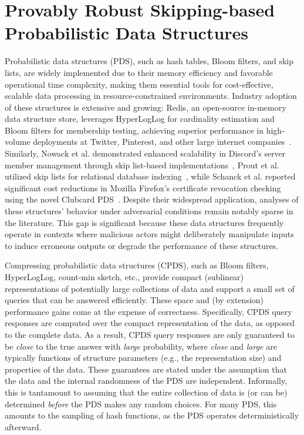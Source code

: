 \chapter{Provably Robust Skipping-based Probabilistic Data Structures}

Probabilistic data structures (PDS), such as hash tables, Bloom filters, and skip lists, are widely implemented due to their memory efficiency and favorable operational time complexity, making them essential tools for cost-effective, scalable data processing in resource-constrained environments. Industry adoption of these structures is extensive and growing: Redis, an open-source in-memory data structure store, leverages HyperLogLog for cardinality estimation and Bloom filters for membership testing, achieving superior performance in high-volume deployments at Twitter, Pinterest, and other large internet companies~\cite{redis}. Similarly, Nowack et al. demonstrated enhanced scalability in Discord's server member management through skip list-based implementations~\cite{discord}, Prout et al. utilized skip lists for relational database indexing~\cite{singlestore}, while Schanck et al. reported significant cost reductions in Mozilla Firefox's certificate revocation checking using the novel Clubcard PDS~\cite{clubcard}. Despite their widespread application, analyses of these structures' behavior under adversarial conditions remain notably sparse in the literature. This gap is significant because these data structures frequently operate in contexts where malicious actors might deliberately manipulate inputs to induce erroneous outputs or degrade the performance of these structures.

Compressing probabilistic data structures (CPDS), such as Bloom filters, HyperLogLog, count-min sketch, etc., provide compact (sublinear) representations of potentially large collections of data and support a small set of queries that can be answered efficiently. These space and (by extension) performance gains come at the expense of correctness.  Specifically, CPDS query responses are computed over the compact representation of the data, as opposed to the complete data.  As a result, CPDS query responses are only guaranteed to be \emph{close} to the true answer with \emph{large} probability, where \emph{close} and \emph{large} are typically functions of structure parameters (e.g., the representation size) and properties of the data. These guarantees are stated under the assumption that the data and the internal randomness of the PDS are independent. Informally, this is tantamount to assuming that the entire collection of data is (or can be) determined \emph{before} the PDS makes any random choices.  For many PDS, this amounts to the sampling of hash functions, as the PDS operates deterministically afterward.

